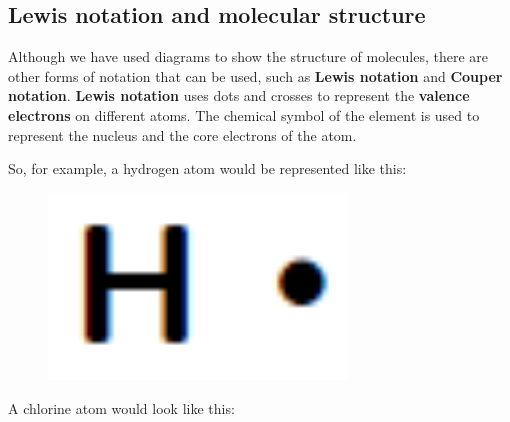     \label{m38701*cid6}
            \subsection{ Lewis notation and molecular structure}
            \nopagebreak
            
      
      \label{m38701*id140105}Although we have used diagrams to show the structure of molecules, there are other forms of notation that can be used, such as \textbf{Lewis notation} and \textbf{Couper notation}. \textbf{Lewis notation} uses dots and crosses to represent the \textbf{valence electrons} on different atoms. The chemical symbol of the element is used to represent the nucleus and the core electrons of the atom.\par 
      \label{m38701*id140135}So, for example, a hydrogen atom would be represented like this:\par 
      \label{m38701*id140141}
        
    \setcounter{subfigure}{0}


	\begin{figure}[H] %
    \begin{center}
    \label{m38701*id140144!!!underscore!!!media}\label{m38701*id140144!!!underscore!!!printimage}\includegraphics[width=300px]{col11305.imgs/m38701_CG11C1_006.png} %
        
      \vspace{2pt}
    \vspace{.1in}
    
    \end{center}

 \end{figure}   

    \addtocounter{footnote}{-0}
    
      \par 
      \label{m38701*id140151}A chlorine atom would look like this:\par 
      \label{m38701*id140154}
        
